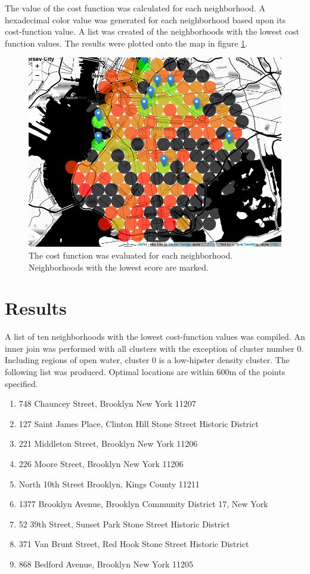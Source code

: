 \documentclass[12pt]{article}
\begin{document}
	The value of the cost function was calculated for each neighborhood.
	A hexadecimal color value was generated for each neighborhood based upon its cost-function value.
	A list was created of the neighborhoods with the lowest cost function values.
	The results were plotted onto the map in figure \ref{fig:scoremap}.\\
\begin{figure}[H]
  \includegraphics[width=6.5in]{scoremap.png}
	\caption{The cost function was evaluated for each neighborhood. Neighborhoods with the lowest score are marked.}
  \label{fig:scoremap}
\end{figure}

\section{Results}

	A list of  ten neighborhoods with the lowest cost-function values was compiled.
	An inner join was performed with all clusters with the exception of cluster number 0.
	Including regions of open water, cluster 0 is a low-hipster density cluster.
	The following list was produced.
	Optimal locations are within 600m of the points specified.
	
\begin{enumerate}[noitemsep]
	\item 748 Chauncey Street, Brooklyn New York 11207
	\item 127 Saint James Place, Clinton Hill Stone Street Historic District 
	\item 221 Middleton Street, Brooklyn New York 11206
	\item 226 Moore Street, Brooklyn New York 11206
	\item North 10th Street Brooklyn, Kings County 11211 
	\item 1377 Brooklyn Avenue, Brooklyn Community District 17, New York
	\item 52 39th Street, Sunset Park Stone Street Historic District 
	\item 371 Van Brunt Street, Red Hook Stone Street Historic District 
	\item 868 Bedford Avenue, Brooklyn New York 11205
\end{enumerate}
\end{document}
